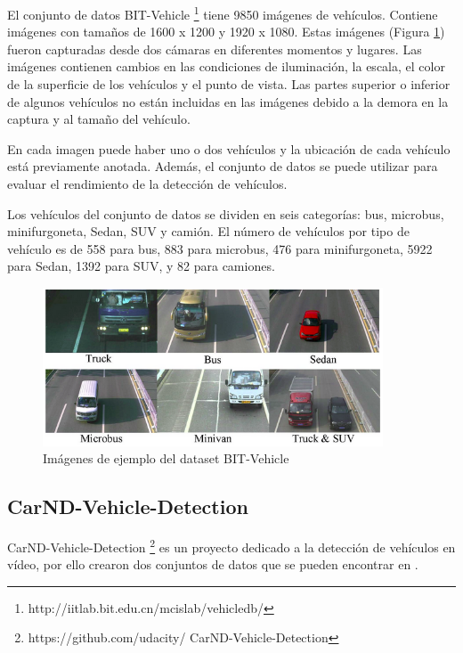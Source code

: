 El conjunto de datos BIT-Vehicle \footnote{http://iitlab.bit.edu.cn/mcislab/vehicledb/}\cite{bit} tiene 9850 imágenes de vehículos. Contiene imágenes con tamaños de 1600 x 1200 y 1920 x 1080. Estas imágenes (Figura \ref{fig.bit}) fueron capturadas desde dos cámaras en diferentes momentos y lugares. Las imágenes contienen cambios en las condiciones de iluminación, la escala, el color de la superficie de los vehículos y el punto de vista. Las partes superior o inferior de algunos vehículos no están incluidas en las imágenes debido a la demora en la captura y al tamaño del vehículo. 

En cada imagen puede haber uno o dos vehículos y la ubicación de cada vehículo está previamente anotada. Además, el conjunto de datos se puede utilizar para evaluar el rendimiento de la detección de vehículos.

Los vehículos del conjunto de datos se dividen en seis categorías: bus, microbus, minifurgoneta, Sedan, SUV y camión. El número de vehículos por tipo de vehículo es de 558 para bus, 883 para microbus, 476 para minifurgoneta, 5922 para Sedan, 1392 para SUV, y 82 para camiones.

\begin{figure}[H] 
\begin{center}
	\includegraphics[width=0.9\textwidth]{figures/Estado_arte/bit.png}
   \caption{Imágenes de ejemplo del dataset BIT-Vehicle}
	\label{fig.bit}
\end{center}
\end{figure}

\subsection{CarND-Vehicle-Detection}

CarND-Vehicle-Detection \footnote{https://github.com/udacity/
CarND-Vehicle-Detection}\cite{carnd1} es un proyecto dedicado a la detección de vehículos en vídeo, por ello crearon dos conjuntos de datos que se pueden encontrar en \cite{carnd2}.

